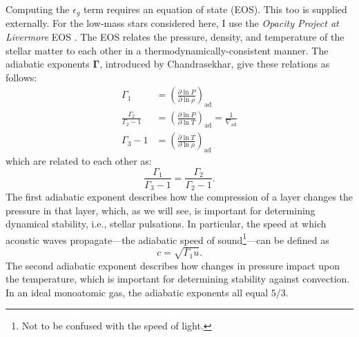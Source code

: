 \begin{description}
    
    Computing the $\epsilon_g$ term requires an equation of state (EOS). 
    This too is supplied externally. For the low-mass stars considered here, I use the \emph{Opacity Project at Livermore} EOS \citep[\textsc{OPAL},][]{2002apj...576.1064r}. 
    The EOS relates the pressure, density, and temperature of the stellar matter to each other in a thermodynamically-consistent manner. 
    The adiabatic exponents $\boldsymbol\Gamma$, introduced by Chandrasekhar, give these relations as follows: %
    \begin{align} 
        \Gamma_1 
        &= 
        \left(
            \frac{\partial \ln P}{\partial \ln \rho}
        \right)_{\text{ad}} 
        \\
        \frac{\Gamma_2}{\Gamma_2-1}
        &= \label{eq:gamma2}
        \left(
            \frac{\partial \ln P}{\partial \ln T}
        \right)_{\text{ad}} = \frac{1}{\nabla_{\text{ad}}}
        \\
        \Gamma_3 - 1 
        &= 
        \left(
            \frac{\partial \ln T}{\partial \ln \rho}
        \right)_{\text{ad}}
    \end{align}
    which are related to each other as: 
    \begin{equation}
        \frac{\Gamma_1}{\Gamma_3 - 1}
        =
        \frac{\Gamma_2}{\Gamma_2-1}.
    \end{equation}
    The first adiabatic exponent describes how the compression of a layer changes the pressure in that layer, which, as we will see, is important for determining dynamical stability, i.e., stellar pulsations. 
    In particular,  the speed at which acoustic waves propagate---the adiabatic speed of sound\footnote{ Not to be confused with the speed of light.}---can be defined as 
    \begin{equation} \label{eq:speed-of-sound}
        c = \sqrt{\Gamma_1 u}. 
    \end{equation}
    The second adiabatic exponent describes how changes in pressure impact upon the temperature, which is important for determining stability against convection. 
    In an ideal monoatomic gas, the adiabatic exponents all equal $5/3$. %

    
    

\end{description}
